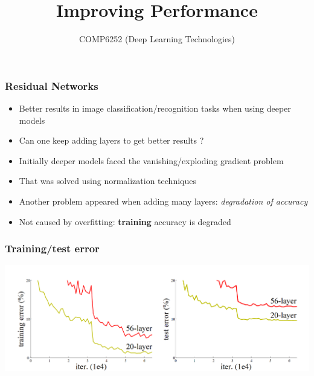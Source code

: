 \documentclass{beamer}
\begin{document}
\title{Improving Performance}
\author{COMP6252 (Deep Learning Technologies)}
 \date{}

\begin{frame}
	\frametitle{Residual Networks}
\begin{itemize}
	\item Better results in image classification/recognition tasks when using deeper models 
	\item Can one keep adding layers  to get better results ?
	\item Initially deeper models faced the vanishing/exploding gradient problem
	\item That was solved using normalization techniques
	\item Another problem appeared when adding many layers: \textit{degradation of accuracy}
	\item Not caused by overfitting: \textbf{training} accuracy is degraded 
\end{itemize}
\end{frame}

\begin{frame}
    \frametitle{Training/test error}
\begin{center}
    \includegraphics[width=\textwidth]{figs/deeper-error.png}
\end{center}

\end{frame}
\end{document}
